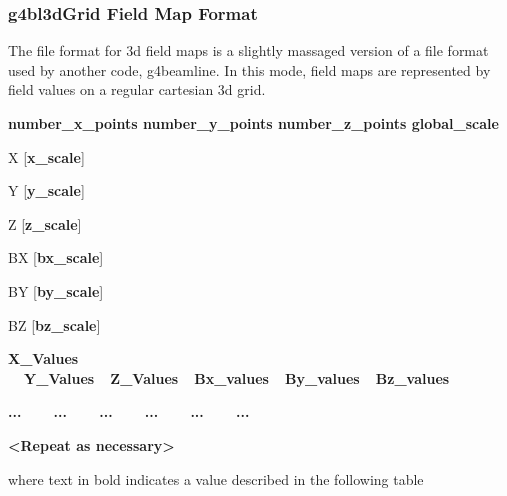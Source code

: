 \subsubsection{g4bl3dGrid Field Map Format}
The file format for 3d field maps is a slightly massaged version of a file format used by another code, g4beamline. In
this mode, field maps are represented by field values on a regular cartesian 3d grid.

{\ttfamily\bfseries
number\_x\_points number\_y\_points number\_z\_points global\_scale}

{ X [\textbf{x\_scale}]}

{ Y [\textbf{y\_scale}]}

{ Z [\textbf{z\_scale}]}

{ BX [\textbf{bx\_scale}]}

{ BY [\textbf{by\_scale}]}

{ BZ [\textbf{bz\_scale}]}

{}

{\ttfamily\bfseries
X\_Values \ \ Y\_Values\ \ Z\_Values\ \ Bx\_values\ \ By\_values\ \ Bz\_values}

{\ttfamily\bfseries
...\ \ \ \ ...\ \ \ \ ...\ \ \ \ ...\ \ \ \ ...\ \ \ \ ...}

{\ttfamily\bfseries
{\textless}Repeat as necessary{\textgreater}}

where text in bold indicates a value described in the following table

